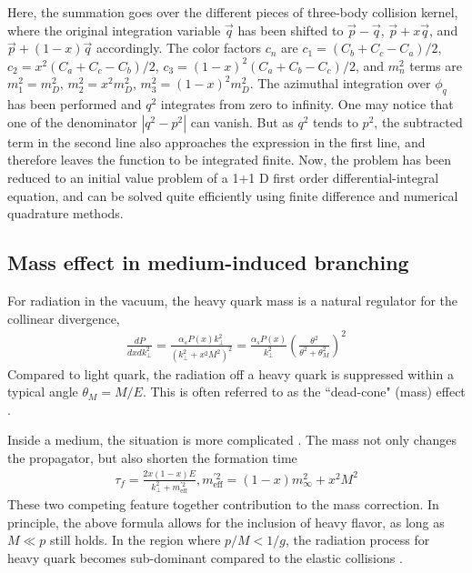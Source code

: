 Here, the summation goes over the different pieces of three-body collision kernel, where the original integration variable $\vec{q}$ has been shifted to $\vec{p}-\vec{q}$, $\vec{p}+x\vec{q}$, and $\vec{p}+(1-x) \vec{q}$ accordingly.
The color factors $c_n$ are $c_1 = (C_b+C_c-C_a)/2$, $c_2 = x^2(C_a+C_c-C_b)/2$, $c_3 = (1-x)^2(C_a+C_b-C_c)/2$, and $m_n^2$ terms are $m_1^2 = m_D^2$, $m_2^2 = x^2 m_D^2$, $m_3^2 = (1-x)^2 m_D^2$.
The azimuthal integration over $\phi_q$ has been performed and $q^2$  integrates from zero to infinity.
One may notice that one of the denominator $|q^2-p^2|$ can vanish.
But as $q^2$ tends to $p^2$, the subtracted term in the second line also approaches the expression in the first line, and therefore leaves the function to be integrated finite.
Now, the problem has been reduced to an initial value problem of a 1+1 D first order differential-integral equation, and can be solved quite efficiently using finite difference and numerical quadrature methods.

\subsection{Mass effect in medium-induced branching}
For radiation in the vacuum, the heavy quark mass is a natural regulator for the collinear divergence,
\begin{eqnarray}
\frac{dP}{dx dk_\perp^2} = \frac{\alpha_s P(x) k_\perp^2}{(k_\perp^2 + x^2 M^2)^2} = \frac{\alpha_s P(x)}{k_\perp^2}\left(\frac{\theta^2}{\theta^2 + \theta_M^2}\right)^2
\end{eqnarray}
Compared to light quark, the radiation off a heavy quark is suppressed within a typical angle $\theta_M = M/E$.
This is often referred to as the ``dead-cone" (mass) effect \cite{Dokshitzer_1991}.

Inside a medium, the situation is more complicated \cite{Dokshitzer:2001zm,Armesto:2003jh,Abir:2012pu,Zhang:2003wk}. 
The mass not only changes the propagator, but also shorten the formation time
\begin{eqnarray}
\tau_f = \frac{2x(1-x)E}{k_\perp^2 + m_{\textrm{eff}}^{'2}}, m_{\textrm{eff}}^{'2} = (1-x)m_\infty^2 + x^2 M^2
\end{eqnarray}
These two competing feature together contribution to the mass correction.
In principle, the above formula allows for the inclusion of heavy flavor, as long as $M\ll p$ still holds.
In the region where $p/M < 1/g$, the radiation process for heavy quark becomes sub-dominant compared to the elastic collisions \cite{Moore:2004tg}.


